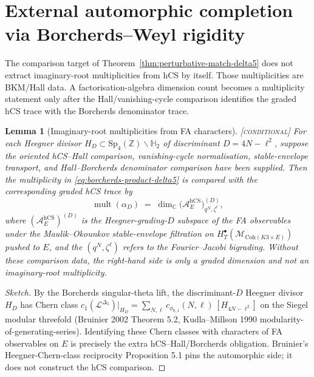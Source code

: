 \documentclass[11pt]{amsart}
\providecommand{\C}{\mathbb{C}}
\providecommand{\Z}{\mathbb{Z}}
\providecommand{\Coh}{\mathrm{Coh}}
\providecommand{\cA}{\mathcal{A}}
\providecommand{\cL}{\mathcal{L}}
\providecommand{\cM}{\mathcal{M}}
\providecommand{\Sp}{\mathrm{Sp}}
\providecommand{\hCS}{\mathrm{hCS}}
\providecommand{\mult}{\operatorname{mult}}
\providecommand{\ClaimStatusConditional}{\textsc{[conditional]}}
\theoremstyle{plain}
\newtheorem{lemma}[theorem]{Lemma}
\theoremstyle{definition}
\theoremstyle{remark}
\begin{document}
\section{External automorphic completion via Borcherds--Weyl rigidity}
\label{sec:reconstruction-borcherds-weyl}

The comparison target of Theorem~\ref{thm:perturbative-match-delta5}
does not extract imaginary-root multiplicities from hCS by itself.
Those multiplicities are BKM/Hall data. A factorisation-algebra
dimension count becomes a multiplicity statement only after the
Hall/vanishing-cycle comparison identifies the graded hCS trace with the
Borcherds denominator trace.

\begin{lemma}[Imaginary-root multiplicities from FA characters]
\label{lem:imag-root-mult-from-FA}
\ClaimStatusConditional{}
For each Heegner divisor $H_{D}\subset\Sp_{4}(\Z)\backslash\mathbb{H}_{2}$
of discriminant $D=4N-\ell^{2}$, suppose the oriented hCS--Hall
comparison, vanishing-cycle normalisation, stable-envelope transport,
and Hall--Borcherds denominator comparison have been supplied. Then the
multiplicity in \eqref{eq:borcherds-product-delta5} is compared with
the corresponding graded hCS trace by
\[
\mult(\alpha_{D})
\;=\;
\dim_{\C}\bigl(\cA_{E}^{\hCS}\bigr)^{(D)}_{q^{N},\zeta^{\ell}},
\]
where $(\cA_{E}^{\hCS})^{(D)}$ is the Heegner-grading-$D$ subspace of
the FA observables under the Maulik--Okounkov stable-envelope
filtration on $H^{\bullet}_{T}(\cM_{\Coh(K3\times E)})$ pushed to $E$,
and the $(q^{N},\zeta^{\ell})$ refers to the Fourier--Jacobi bigrading.
Without these comparison data, the right-hand side is only a graded
dimension and not an imaginary-root multiplicity.
\end{lemma}

\begin{proof}[Sketch]
By the Borcherds singular-theta lift, the discriminant-$D$ Heegner
divisor $H_{D}$ has Chern class
$c_{1}(\cL^{\Delta_{5}})|_{H_{D}}=\sum_{N,\ell}c_{\phi_{0,1}}(N,\ell)\,
[H_{4N-\ell^{2}}]$ on the Siegel modular threefold (Bruinier 2002
\cite{Bruinier2002} Theorem 5.2, Kudla--Millson 1990 \cite{Kudla1997}
modularity-of-generating-series). Identifying these Chern classes with
characters of FA observables on $E$ is precisely the extra
hCS--Hall/Borcherds obligation. Bruinier's Heegner-Chern-class
reciprocity \cite{Bruinier2002} Proposition 5.1 pins the automorphic
side; it does not construct the hCS comparison.
\end{proof}
\end{document}
